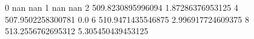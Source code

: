 0 nan nan
1 nan nan
2 509.8230895996094 1.87286376953125
4 507.9502258300781 0.0
6 510.9471435546875 2.996917724609375
8 513.2556762695312 5.305450439453125
